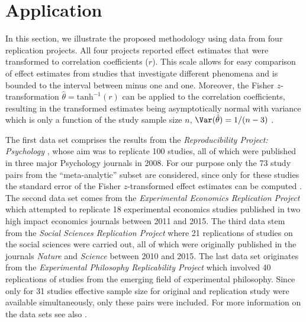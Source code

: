 \section{Application}\label{sec2:application}
In this section, we illustrate the proposed methodology using data from four
replication projects. All four projects reported effect estimates that were
transformed to correlation coefficients ($r$). This scale allows for easy
comparison of effect estimates from studies that investigate different phenomena
and is bounded to the interval between minus one and one. Moreover, the Fisher
$z$-transformation $\hat{\theta} = \text{tanh}^{-1}(r)$ can be applied to the
correlation coefficients, resulting in the transformed estimates being
asymptotically normal with variance which is only a function of the study sample
size $n$, \ie $\Var(\hat{\theta}) = 1/(n - 3)$ \citep{Fisher1921}.



The first data set comprises the results from the \textit{Reproducibility
  Project: Psychology} \citep{Opensc2015}, whose aim was to replicate 100
studies, all of which were published in three major Psychology journals in 2008.
For our purpose only the 73 study pairs from the ``meta-analytic'' subset are
considered, since only for these studies the standard error of the Fisher
$z$-transformed effect estimates can be computed \citep{Johnson2016}. The second
data set comes from the \textit{Experimental Economics Replication Project}
\citep{Camerer2016} which attempted to replicate 18 experimental economics
studies published in two high impact economics journals between 2011 and 2015.
The third data stem from the \textit{Social Sciences Replication Project}
\citep{Camerer2018} where 21 replications of studies on the social sciences were
carried out, all of which were originally published in the journals
\textit{Nature} and \textit{Science} between 2010 and 2015. The last data set
originates from the \textit{Experimental Philosophy Replicability Project}
\citep{Cova2018} which involved 40 replications of studies from the emerging
field of experimental philosophy. Since only for 31 studies effective sample
size for original and replication study were available simultaneously, only
these pairs were included. For more information on the data sets see also
\citet{Pawel2020}.

